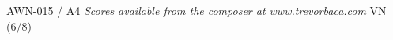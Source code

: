 \documentclass[11pt]{report}
\begin{document}
\null \vfill

AWN-015 / A4 \hfill
\textit{Scores available from the composer at www.trevorbaca.com}
\hfill VN (6/8)
\end{document}
